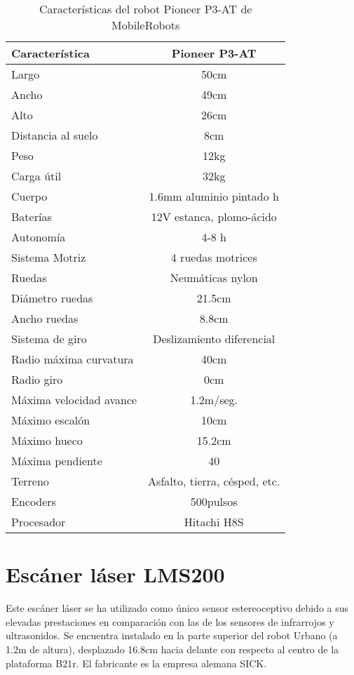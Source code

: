 \begin{table}[h]
\begin{center}
\caption{Características del robot Pioneer P3-AT de MobileRobots}\label{tb:p3at}

\vspace{5mm}

\begin{tabular}{|l|c|} \hline
Característica & Pioneer P3-AT\\
\hline
\hline
Largo & 50cm\\
\hline
Ancho & 49cm\\
\hline
Alto & 26cm\\
\hline
Distancia al suelo & 8cm\\
\hline
Peso & 12kg\\
\hline
Carga útil & 32kg\\
\hline
Cuerpo & 1.6mm aluminio pintado h\\
\hline
Baterías & 12V estanca, plomo-ácido\\
\hline
\hline
Autonomía & 4-8 h\\
\hline
Sistema Motriz & 4 ruedas motrices\\
\hline
Ruedas &  Neumáticas nylon\\
\hline
\hline
Diámetro ruedas & 21.5cm\\
\hline
Ancho ruedas & 8.8cm\\
\hline
Sistema de giro & Deslizamiento diferencial\\
\hline
Radio máxima curvatura & 40cm\\
\hline
Radio giro & 0cm\\
\hline
\hline
Máxima velocidad avance & 1.2m/seg.\\
\hline
Máximo escalón & 10cm\\
\hline
Máximo hueco & 15.2cm\\
\hline
Máxima pendiente & 40\\
\hline
Terreno & Asfalto, tierra, césped, etc.\\
\hline
Encoders & 500pulsos\\
\hline
Procesador & Hitachi H8S\\
\hline
\end{tabular}
\end{center}
\end{table}



\clearpage
\section{Escáner láser LMS200}\label{laser}
Este escáner láser se ha utilizado como único sensor estereoceptivo debido a sus elevadas prestaciones en comparación con las de los sensores de infrarrojos y ultrasonidos. Se encuentra instalado en la parte superior del robot Urbano (a 1.2m de altura), desplazado 16.8cm hacia delante con respecto al centro de la plataforma B21r. El fabricante es la empresa alemana SICK.

